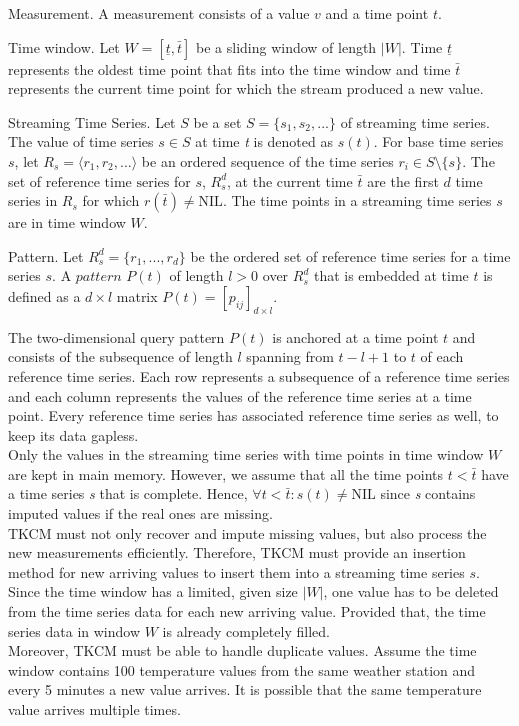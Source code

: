 \documentclass[abstracton,12pt]{scrreprt}
\begin{document}
\begin{defn}
	Measurement. A measurement consists of a value $v$ and a time point $t$.
\end{defn}
\begin{defn}
	Time window. Let $W=[ \underline{t}, \bar{t} ]$ be a sliding window of length $|W|$. Time $\underline{t}$ represents the oldest time point that fits into the time window and time $\bar{t}$ represents the current time point for which the stream produced a new value. 
\end{defn}
\begin{defn}
	Streaming Time Series. Let $S$ be a set $S = \{s_1,s_2,...\}$ of streaming time series. The value of time series $s \in S$ at time \emph{t} is denoted as $s(t)$. For base time series $s$, let $R_s = \langle r_1, r_2,...\rangle$ be an ordered sequence of the time series $r_i \in S \setminus \{s\}$. The set of $\text{reference time series}$ for $s$, $R_s^d$, at the current time $\bar{t}$ are the first $d$ time series in $R_s$ for which $r(\bar{t}) \neq \text{NIL}$.
	The time points in a streaming time series $s$ are in time window $W$. 
\end{defn}
\begin{defn}
	Pattern. Let $R_s^d=\{r_1,...,r_d\}$ be the ordered set of reference time series for a time series $s$. A $pattern$ $P(t)$ of length $l > 0$ over $R_s^d$ that is embedded at time $t$ is defined as a $d\times l$ matrix $P(t) = [p_{ij}]_{d\times l}$. 
\end{defn}
The two-dimensional query pattern $P(t)$ is anchored at a time point $t$ and consists of the subsequence of length $l$ spanning from $t-l+1$ to $t$ of each reference time series. Each row represents a subsequence of a reference time series and each column represents the values of the reference time series at a time point. Every reference time series has associated reference time series as well, to keep its data gapless.\\ 
Only the values in the streaming time series with time points in time window $W$ are kept in main memory. However, we assume that all the time points $t < \bar{t}$ have a time series \emph{s} that is complete. Hence, $\forall t < \bar{t} : s(t) \ne \text{NIL}$ since \emph{s} contains imputed values if the real ones are missing. \\
TKCM must not only recover and impute missing values, but also process the new measurements efficiently. Therefore, TKCM must provide an insertion method for new arriving values to insert them into a streaming time series $s$. Since the time window has a limited, given size $|W|$, one value has to be deleted from the time series data for each new arriving value. Provided that, the time series data in window $W$ is already completely filled. \\       
Moreover, TKCM must be able to handle duplicate values. Assume the time window contains 100 temperature values from the same weather station and every 5 minutes a new value arrives. It is possible that the same temperature value arrives multiple times.
\end{document}
